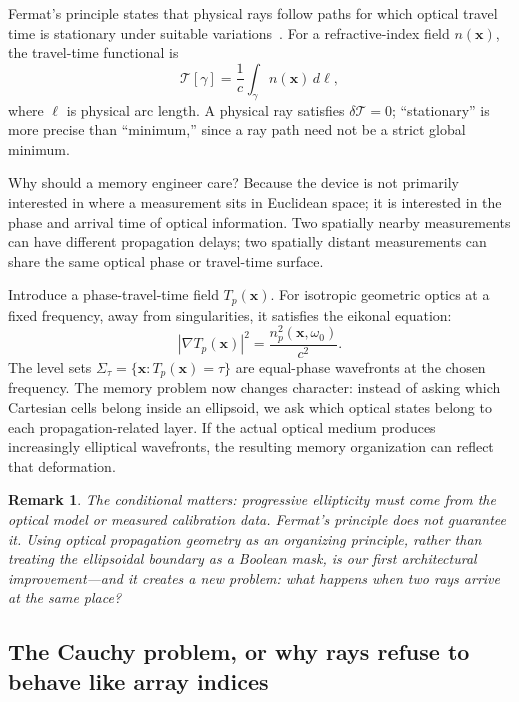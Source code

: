 \documentclass[11pt]{article}
\newtheorem{remark}[theorem]{Remark}
\newcommand{\xv}{\mathbf{x}}
\begin{document}
Fermat's principle states that physical rays follow paths for which optical travel time
is stationary under suitable variations~\cite{fermat1662,bornwolf1999}. For a
refractive-index field $n(\xv)$, the travel-time functional is
\begin{equation}
\mathcal{T}[\gamma] = \frac1c \int_\gamma n(\xv)\, d\ell,
\end{equation}
where $\ell$ is physical arc length. A physical ray satisfies
$\delta\mathcal{T} = 0$; ``stationary'' is more precise than ``minimum,'' since a ray
path need not be a strict global minimum.

Why should a memory engineer care? Because the device is not primarily interested in
where a measurement sits in Euclidean space; it is interested in the phase and arrival
time of optical information. Two spatially nearby measurements can have different
propagation delays; two spatially distant measurements can share the same optical
phase or travel-time surface.

Introduce a phase-travel-time field $T_p(\xv)$. For isotropic geometric optics at a
fixed frequency, away from singularities, it satisfies the eikonal equation:
\begin{equation}
\boxed{\left|\nabla T_p(\xv)\right|^2 = \frac{n_p^2(\xv,\omega_0)}{c^2}.}
\end{equation}
The level sets $\Sigma_\tau = \{\xv : T_p(\xv) = \tau\}$ are equal-phase wavefronts at
the chosen frequency. The memory problem now changes character: instead of asking which
Cartesian cells belong inside an ellipsoid, we ask which optical states belong to each
propagation-related layer. If the actual optical medium produces increasingly
elliptical wavefronts, the resulting memory organization can reflect that deformation.

\begin{remark}
The conditional matters: progressive ellipticity must come from the optical model or
measured calibration data. Fermat's principle does not guarantee it. Using optical
propagation geometry as an organizing principle, rather than treating the ellipsoidal
boundary as a Boolean mask, is our first architectural improvement---and it creates a
new problem: what happens when two rays arrive at the same place?
\end{remark}

\subsection{The Cauchy problem, or why rays refuse to behave like array indices}
\end{document}
